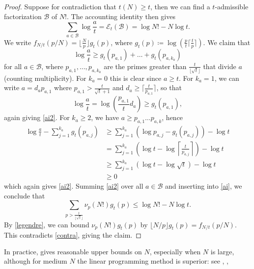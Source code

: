 \documentclass[12pt,a4paper,reqno]{amsart}
\numberwithin{equation}{section}
\theoremstyle{plain}
\theoremstyle{definition}
\newcommand\tuple{{\mathcal B}}
\newcommand\excess{{\mathcal{E}}}
\begin{document}
  \begin{proof} Suppose for contradiction that $t(N) \geq t$, then we can find a $t$-admissible factorization $\tuple$ of $N!$.  The accounting identity then gives
  \begin{equation}\label{ai}
  \sum_{a \in \tuple} \log \frac{a}{t} = \excess_t(\tuple) = \log N! - N \log t.
  \end{equation}
  We write $f_{N/t}(p/N) = \lfloor \frac{N}{p} \rfloor g_t(p)$, where $g_t(p) \coloneqq \log (\frac{p}{t} \lceil \frac{t}{p} \rceil)$.  We claim that 
    \begin{equation}\label{ai2}
      \log \frac{a}{t} \geq g_t(p_{a,1}) + \dots + g_t(p_{a,k_a})
    \end{equation}
for all $a \in \tuple$, where $p_{a,1},\dots,p_{a,k_a}$ are the primes greater than $\frac{t}{\lfloor \sqrt{t}\rfloor}$ that divide $a$ (counting multiplicity).  For $k_a=0$ this is clear since $a \geq t$.  For $k_a=1$, we can write $a = d_a p_{a,1}$ where $p_{a,1} > \frac{t}{\sqrt{t}+1}$ and $d_a \geq \lceil \frac{t}{p_{a,1}} \rceil$, so that
    $$ \log \frac{a}{t} = \log \left(\frac{p_{a,1}}{t}d_a \right) \geq g_t(p_{a,1}),$$
    again giving \eqref{ai2}.  For $k_a \geq 2$, we have $a \geq p_{a,1} \dots p_{a,k}$, hence
    \begin{align*}
      \log \frac{a}{t} - \sum_{j=1}^{k_a} g_t(p_{a,j}) &\geq \sum_{j=1}^{k_a} (\log p_{a,j} - g_t(p_{a,j})) - \log t \\
      &= \sum_{j=1}^{k_a} \left(\log t - \log \left \lceil \frac{t}{p_{a,j}} \right\rceil \right) - \log t \\
      &\geq \sum_{j=1}^{k_a} \left(\log t - \log \sqrt{t} \right) - \log t \\
      &\geq 0
    \end{align*}
    which again gives \eqref{ai2}.  Summing \eqref{ai2} over all $a \in \tuple$ and inserting into \eqref{ai}, we conclude that
    $$ \sum_{p > \frac{t}{\lfloor\sqrt{t}\rfloor}} \nu_p(N!) g_t(p) \leq \log N! - N \log t.$$    
    By \eqref{legendre}, we can bound $\nu_p(N!) g_t(p)$ by $\lfloor N/p \rfloor g_t(p) = f_{N/t}(p/N)$.  This contradicts \eqref{contra}, giving the claim. 
  \end{proof}

In practice,  gives reasonable upper bounds on $N$, especially when $N$ is large, although for medium $N$ the linear programming method is superior: see , , 
    
\end{document}
